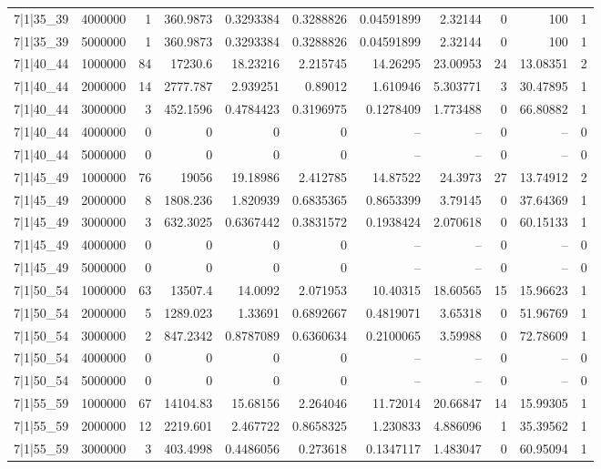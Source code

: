 \begin{tabular}{lrrrrrrrrrr}
7|1|35\_39 & 4000000 & 1 & 360.9873 & 0.3293384 & 0.3288826 & 0.04591899 & 2.32144 & 0 & 100 & 1 \\
7|1|35\_39 & 5000000 & 1 & 360.9873 & 0.3293384 & 0.3288826 & 0.04591899 & 2.32144 & 0 & 100 & 1 \\
7|1|40\_44 & 1000000 & 84 & 17230.6 & 18.23216 & 2.215745 & 14.26295 & 23.00953 & 24 & 13.08351 & 2 \\
7|1|40\_44 & 2000000 & 14 & 2777.787 & 2.939251 & 0.89012 & 1.610946 & 5.303771 & 3 & 30.47895 & 1 \\
7|1|40\_44 & 3000000 & 3 & 452.1596 & 0.4784423 & 0.3196975 & 0.1278409 & 1.773488 & 0 & 66.80882 & 1 \\
7|1|40\_44 & 4000000 & 0 & 0 & 0 & 0 & -- & -- & 0 & -- & 0 \\
7|1|40\_44 & 5000000 & 0 & 0 & 0 & 0 & -- & -- & 0 & -- & 0 \\
7|1|45\_49 & 1000000 & 76 & 19056 & 19.18986 & 2.412785 & 14.87522 & 24.3973 & 27 & 13.74912 & 2 \\
7|1|45\_49 & 2000000 & 8 & 1808.236 & 1.820939 & 0.6835365 & 0.8653399 & 3.79145 & 0 & 37.64369 & 1 \\
7|1|45\_49 & 3000000 & 3 & 632.3025 & 0.6367442 & 0.3831572 & 0.1938424 & 2.070618 & 0 & 60.15133 & 1 \\
7|1|45\_49 & 4000000 & 0 & 0 & 0 & 0 & -- & -- & 0 & -- & 0 \\
7|1|45\_49 & 5000000 & 0 & 0 & 0 & 0 & -- & -- & 0 & -- & 0 \\
7|1|50\_54 & 1000000 & 63 & 13507.4 & 14.0092 & 2.071953 & 10.40315 & 18.60565 & 15 & 15.96623 & 1 \\
7|1|50\_54 & 2000000 & 5 & 1289.023 & 1.33691 & 0.6892667 & 0.4819071 & 3.65318 & 0 & 51.96769 & 1 \\
7|1|50\_54 & 3000000 & 2 & 847.2342 & 0.8787089 & 0.6360634 & 0.2100065 & 3.59988 & 0 & 72.78609 & 1 \\
7|1|50\_54 & 4000000 & 0 & 0 & 0 & 0 & -- & -- & 0 & -- & 0 \\
7|1|50\_54 & 5000000 & 0 & 0 & 0 & 0 & -- & -- & 0 & -- & 0 \\
7|1|55\_59 & 1000000 & 67 & 14104.83 & 15.68156 & 2.264046 & 11.72014 & 20.66847 & 14 & 15.99305 & 1 \\
7|1|55\_59 & 2000000 & 12 & 2219.601 & 2.467722 & 0.8658325 & 1.230833 & 4.886096 & 1 & 35.39562 & 1 \\
7|1|55\_59 & 3000000 & 3 & 403.4998 & 0.4486056 & 0.273618 & 0.1347117 & 1.483047 & 0 & 60.95094 & 1 \\

\end{tabular}
